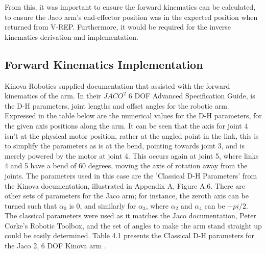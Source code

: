\documentclass[12pt,openany,a4paper]{book}
\begin{document}
\vspace{\baselineskip}


\vspace{\baselineskip}

From this, it was important to ensure the forward kinematics can be calculated, to ensure the Jaco arm's end-effector position was in the expected position when returned from V-REP. Furthermore, it would be required for the inverse kinematics derivation and implementation. 

\subsection{Forward Kinematics Implementation}
Kinova Robotics supplied documentation that assisted with the forward kinematics of the arm. In their $JACO^2$ 6 DOF Advanced Specification Guide, is the D-H parameters, joint lengths and offset angles for the robotic arm. Expressed in the table below are the numerical values for the D-H parameters, for the given axis positions along the arm. It can be seen that the axis for joint 4 isn't at the physical motor position, rather at the angled point in the link, this is to simplify the parameters as is at the bend, pointing towards joint 3, and is merely powered by the motor at joint 4. This occurs again at joint 5, where links 4 and 5 have a bend of 60 degrees, moving the axis of rotation away from the joints. The parameters used in this case are the 'Classical D-H Parameters' from the Kinova documentation, illustrated in Appendix A, Figure A.6. There are other sets of parameters for the Jaco arm; for instance, the zeroth axis can be turned such that $\alpha_0$ is 0, and similarly for $\alpha_3$, where $\alpha_2$ and $\alpha_4$ can be $-pi/2$. The classical parameters were used as it matches the Jaco documentation, Peter Corke's Robotic Toolbox, and the set of angles to make the arm stand straight up could be easily determined. Table 4.1 presents the Classical D-H parameters for the Jaco 2, 6 DOF Kinova arm \cite{specificationGuide}.

\vspace{\baselineskip}
\end{document}
